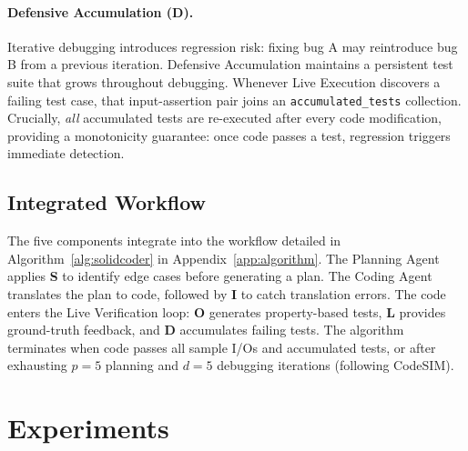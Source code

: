 \documentclass[11pt]{article}
\begin{document}
\paragraph{Defensive Accumulation (D).} Iterative debugging introduces regression risk: fixing bug A may reintroduce bug B from a previous iteration. Defensive Accumulation maintains a persistent test suite that grows throughout debugging. Whenever Live Execution discovers a failing test case, that input-assertion pair joins an \texttt{accumulated\_tests} collection. Crucially, \textit{all} accumulated tests are re-executed after every code modification, providing a monotonicity guarantee: once code passes a test, regression triggers immediate detection.

\subsection{Integrated Workflow}
The five components integrate into the workflow detailed in Algorithm~\ref{alg:solidcoder} in Appendix~\ref{app:algorithm}. The Planning Agent applies \textbf{S} to identify edge cases before generating a plan. The Coding Agent translates the plan to code, followed by \textbf{I} to catch translation errors. The code enters the Live Verification loop: \textbf{O} generates property-based tests, \textbf{L} provides ground-truth feedback, and \textbf{D} accumulates failing tests. The algorithm terminates when code passes all sample I/Os and accumulated tests, or after exhausting $p=5$ planning and $d=5$ debugging iterations (following CodeSIM).

\section{Experiments}
\end{document}
